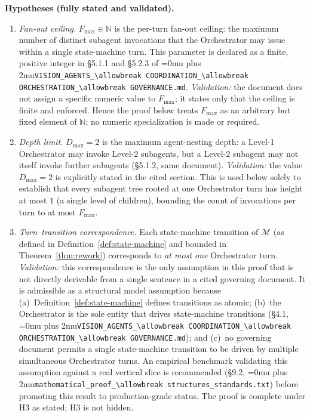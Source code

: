\documentclass[12pt]{article}
\theoremstyle{definition}
\DeclareRobustCommand{\code}[1]{\begingroup\Urlmuskip=0mu plus 2mu\relax\nolinkurl{#1}\endgroup}
\newcommand{\VisionGov}{\code{VISION\_AGENTS\_\allowbreak COORDINATION\_\allowbreak ORCHESTRATION\_\allowbreak GOVERNANCE.md}}
\newcommand{\ProofStd}{\code{mathematical\_proof\_\allowbreak structures\_standards.txt}}
\begin{document}
\medskip
\noindent\textbf{Hypotheses (fully stated and validated).}
\begin{enumerate}
    \item[H1] \emph{Fan-out ceiling.}  $F_{\max} \in \mathbb{N}$ is the
              per-turn fan-out ceiling: the maximum number of distinct
              subagent invocations that the Orchestrator may issue within
              a single state-machine turn.  This parameter is declared as
              a finite, positive integer in \S5.1.1 and \S5.2.3 of
              \VisionGov{}.  \emph{Validation:} the document does
              not assign a specific numeric value to $F_{\max}$; it states
              only that the ceiling is finite and enforced.  Hence the
              proof below treats $F_{\max}$ as an arbitrary but fixed
              element of $\mathbb{N}$; no numeric specialization is made
              or required.

    \item[H2] \emph{Depth limit.}  $D_{\max} = 2$ is the maximum
              agent-nesting depth: a Level-1 Orchestrator may invoke
              Level-2 subagents, but a Level-2 subagent may not itself
              invoke further subagents (\S5.1.2, same document).
              \emph{Validation:} the value $D_{\max}=2$ is explicitly
              stated in the cited section.  This is used below solely to
              establish that every subagent tree rooted at one
              Orchestrator turn has height at most $1$ (a single level of
              children), bounding the count of invocations per turn to
              at most $F_{\max}$.

    \item[H3] \emph{Turn--transition correspondence.}  Each
              state-machine transition of $\mathcal{M}$ (as defined in
              Definition~\ref{def:state-machine} and bounded in
              Theorem~\ref{thm:rework}) corresponds to \emph{at most one}
              Orchestrator turn.
              \emph{Validation:} this correspondence is the only
              assumption in this proof that is not directly derivable from
              a single sentence in a cited governing document.  It is
              admissible as a structural model assumption because
              (a)~Definition~\ref{def:state-machine} defines transitions
              as atomic; (b)~the Orchestrator is the sole entity that
              drives state-machine transitions (\S4.1,
              \VisionGov{}); and (c)~no governing document
              permits a single state-machine transition to be driven by
              multiple simultaneous Orchestrator turns.  An empirical
              benchmark validating this assumption against a real vertical
              slice is recommended (\S9.2,
              \ProofStd{})
              before promoting this result to production-grade status.
              The proof is complete under H3 as stated; H3 is not hidden.


\end{enumerate}
\end{document}

